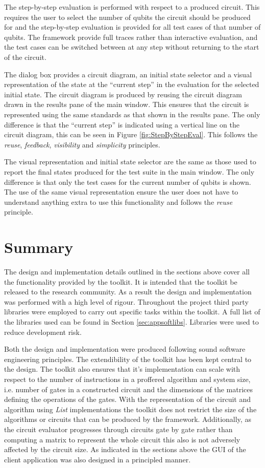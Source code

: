 The step-by-step evaluation is performed with respect to a produced circuit.
This requires the user to select the number of qubits the circuit should be produced for and the step-by-step evaluation is provided for all test cases of that number of qubits.
The framework provide full traces rather than interactive evaluation, and the test cases can be switched between at any step without returning to the start of the circuit.

The dialog box provides a circuit diagram, an initial state selector and a visual representation of the state at the ``current step'' in the evaluation for the selected initial state.
The circuit diagram is produced by reusing the circuit diagram drawn in the results pane of the main window.
This ensures that the circuit is represented using the same standards as that shown in the results pane.
The only difference is that the ``current step'' is indicated using a vertical line on the circuit diagram, this can be seen in Figure \ref{fig:StepByStepEval}.
This follows the \emph{reuse}, \emph{feedback},  \emph{visibility} and \emph{simplicity} principles.

The visual representation and initial state selector are the same as those used to report the final states produced for the test suite in the main window.
The only difference is that only the test cases for the current number of qubits is shown.
The use of the same visual representation ensure the user does not have to understand anything extra to use this functionality and follows the \emph{reuse} principle.

\section{Summary}

The design and implementation details outlined in the sections above cover all the functionality provided by the toolkit.
It is intended that the toolkit be released to the research community.
As a result the design and implementation was performed with a high level of rigour.
Throughout the project third party libraries were employed to carry out specific tasks within the toolkit.
A full list of the libraries used can be found in Section \ref{sec:appsoftlibs}.
Libraries were used to reduce development risk.

Both the design and implementation were produced following sound software engineering principles.
The extendibility of the toolkit has been kept central to the design.
The toolkit also ensures that it's implementation can scale with respect to the number of instructions in a proffered algorithm and system size, i.e. number of gates in a constructed circuit and the dimensions of the matrices defining the operations of the gates.
With the representation of the circuit and algorithm using \emph{List} implementations the toolkit does not restrict the size of the algorithms or circuits that can be produced by the framework.
Additionally, as the circuit evaluator progresses through circuits gate by gate rather than computing a matrix to represent the whole circuit this also is not adversely affected by the circuit size.
As indicated in the sections above the GUI of the client application was also designed in a principled manner.

